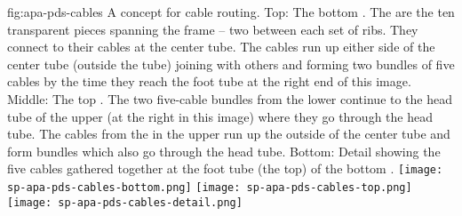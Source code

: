 \begin{dunefigure}{fig:apa-pds-cables}
{%
A concept for  cable routing. Top: The bottom .  The  are the ten transparent pieces spanning the frame -- two between each set of ribs.  They connect to their cables at the center tube.  The cables run up either side of the center tube (outside the tube) joining with others and forming two bundles of five cables by the time they reach the foot tube at the right end of this image. Middle: The top . The two five-cable bundles from the lower  continue to the head tube of the upper  (at the right in this image) where they go through the head tube.  The cables from the  in the upper  run up the outside of the center tube and form bundles which also go through the head tube. Bottom: Detail showing the five  cables gathered together at the foot tube (the top) of the bottom .}
\texttt{[image: sp-apa-pds-cables-bottom.png]}
\hspace*{4mm}\texttt{[image: sp-apa-pds-cables-top.png]}
\vspace{5mm} \\
\hspace*{-10mm}\texttt{[image: sp-apa-pds-cables-detail.png]}
\end{dunefigure}





